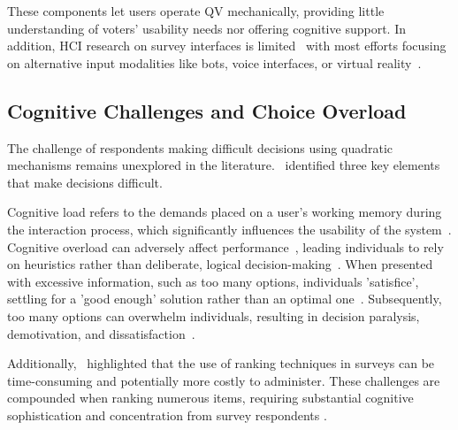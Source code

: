 These components let users operate QV mechanically, providing little understanding of voters' usability needs nor offering cognitive support. In addition, HCI research on survey interfaces is limited~\cite{nobarany2012design, van2007design} with most efforts focusing on alternative input modalities like bots, voice interfaces, or virtual reality~\cite{voiceWei2022, khullar2021, kimComparingDataChatbot2019, feick2020virtual}.

\subsection{Cognitive Challenges and Choice Overload}
The challenge of respondents making difficult decisions using quadratic mechanisms remains unexplored in the literature.~\citet{lichtensteinConstructionPreference2006} identified three key elements that make decisions difficult. 

Cognitive load refers to the demands placed on a user's working memory during the interaction process, which significantly influences the usability of the system~\cite{cooper1998research, seppCognitiveLoadTheory2019}. Cognitive overload can adversely affect performance~\cite{drommi2001interface}, leading individuals to rely on heuristics rather than deliberate, logical decision-making~\cite{daniel2017thinking}. When presented with excessive information, such as too many options, individuals 'satisfice', settling for a 'good enough' solution rather than an optimal one~\cite{simonBehavioralModelRational1955, payneAdaptiveStrategySelection1988, tverskyJudgmentsRepresentativeness}. Subsequently, too many options can overwhelm individuals, resulting in decision paralysis, demotivation, and dissatisfaction~\cite{iyengarWhenChoiceDemotivating2000}.

Additionally,~\citet{alwinMeasurementValuesSurveys1985} highlighted that the use of ranking techniques in surveys can be time-consuming and potentially more costly to administer. These challenges are compounded when ranking numerous items, requiring substantial cognitive sophistication and concentration from survey respondents \cite{featherMeasurementValuesEffects1973}.

